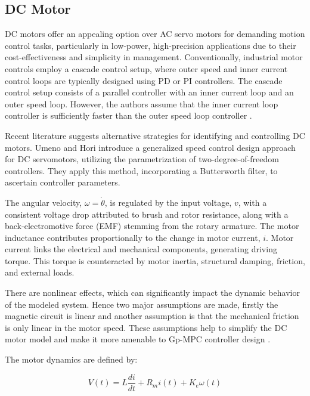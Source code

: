 \subsection{DC Motor}
DC motors offer an appealing option over AC servo motors for demanding motion control tasks, particularly in low-power, high-precision applications due to their cost-effectiveness and simplicity in management. Conventionally, industrial motor controls employ a cascade control setup, where outer speed and inner current control loops are typically designed using PD or PI controllers. The cascade control setup consists of a parallel controller with an inner current loop and an outer speed loop. However, the authors assume that the inner current loop controller is sufficiently faster than the outer speed loop controller \cite{chevrel1996switched}. 

Recent literature suggests alternative strategies for identifying and controlling DC motors. Umeno and Hori \cite{umeno1991robust} introduce a generalized speed control design approach for DC servomotors, utilizing the parametrization of two-degree-of-freedom controllers. They apply this method, incorporating a Butterworth filter, to ascertain controller parameters.

The angular velocity, $\omega =\dot{\theta}$, is regulated by the input voltage, $v$, with a consistent voltage drop attributed to brush and rotor resistance, along with a back-electromotive force (EMF) stemming from the rotary armature. The motor inductance contributes proportionally to the change in motor current, $i$. Motor current links the electrical and mechanical components, generating driving torque. This torque is counteracted by motor inertia, structural damping, friction, and external loads\cite{suman2016speed}.

There are nonlinear effects, which can significantly impact the dynamic behavior of the modeled system. Hence two major assumptions are made, firstly the magnetic circuit is linear and another assumption is that the mechanical friction is only linear in the motor speed. These assumptions help to simplify the DC motor model and make it more amenable to Gp-MPC controller design \cite{puig2016identification}. 

The motor dynamics are defined by:

\begin{equation} \label{eq:dc_motor_dynamics_1}
    V(t) = L\frac{di}{dt} + R_m i(t) + K_e \omega(t)
\end{equation}

